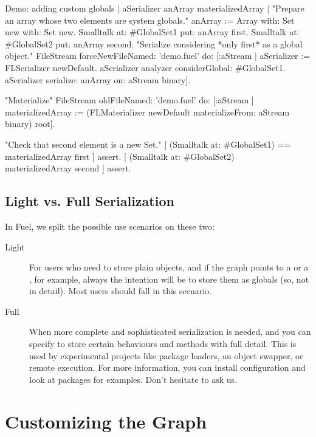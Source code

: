 \documentclass[a4paper,10pt,twoside]{book}
\begin{document}
\begin{code}{Demo: adding custom globals}
| aSerializer anArray materializedArray |
"Prepare an array whose two elements are system globals."
anArray := Array with: Set new with: Set new.
Smalltalk at: #GlobalSet1 put: anArray first.
Smalltalk at: #GlobalSet2 put: anArray second.
"Serialize considering *only first* as a global object."
FileStream forceNewFileNamed: 'demo.fuel' do: [:aStream |
	aSerializer := FLSerializer newDefault.
	aSerializer analyzer considerGlobal: #GlobalSet1.
	aSerializer serialize: anArray on: aStream binary].

"Materialize"
FileStream oldFileNamed: 'demo.fuel' do: [:aStream |
	materializedArray := (FLMaterializer newDefault 
		materializeFrom: aStream binary) root].
	
"Check that second element is a new Set."
[ (Smalltalk at: #GlobalSet1) == materializedArray first ] assert.
[ (Smalltalk at: #GlobalSet2) ~~ materializedArray second ] assert.
\end{code}


\subsection{Light vs. Full Serialization}

In Fuel, we split the possible use scenarios on these two:

\begin{description}

\item[Light]
For users who need to store plain objects, and if the graph points to a  or a , for example, always the intention will be to store them as globals (so, not in detail). Most users should fall in this scenario.

\item[Full]
When more complete and sophisticated serialization is needed, and you can specify to store certain behaviours and methods with full detail. This is used by experimental projects like package loaders, an object swapper, or remote execution. For more information, you can install  configuration and look at  packages for examples. Don't hesitate to ask us.

\end{description}


\section{Customizing the Graph}
\end{document}
